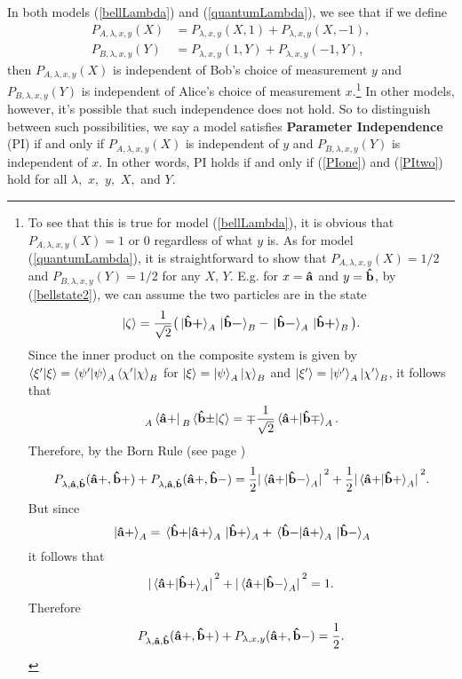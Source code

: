 In both models (\ref{bellLambda}) and (\ref{quantumLambda}), we see that if we define
\begin{align}
P_{A, \lambda,x,y}(X)&=P_{\lambda,x,y}(X, 1)+P_{\lambda,x,y}(X, -1),\label{PIone}\\
P_{B, \lambda,x,y}(Y)&=P_{\lambda,x,y}(1, Y)+P_{\lambda,x,y}(-1, Y),\label{PItwo}
\end{align}
then $P_{A,\lambda,x,y}(X)$ is independent of Bob's choice of measurement $y$ and $P_{B,\lambda,x,y}(Y)$ is independent of Alice's choice of measurement $x$.\footnote{To see that this is true for model (\ref{bellLambda}), it is obvious that $P_{A, \lambda,x,y}(X)=1$ or 0 regardless of what $y$ is. As for model (\ref{quantumLambda}), it is straightforward to show\label{onehalf} that $P_{A, \lambda,x,y}(X)=1/2$ and $P_{B,\lambda,x,y}(Y)=1/2$ for any $X,\, Y$. E.g. for $x=\vb{\hat{a}}$ and $y=\vb{\hat{b}}$, by (\ref{bellstate2}), we can assume the two particles are in the state 
$$\ket{\zeta}=\frac{1}{\sqrt{2}}\big(\ket*{\vb{\hat{{b}}}\bm{+}}_A\ket*{\vb{\hat{{b}}}\bm{-}}_B-\ket*{\vb{\hat{{b}}}\bm{-}}_A\ket*{\vb{\hat{{b}}}\bm{+}}_B\big).$$
Since the inner product on the composite system is given by  $\ip{\xi'}{\xi}=\ip{\psi'}{\psi}_A\ip{\chi'}{\chi}_B$ for $\ket{\xi}=\ket{\psi}_A\ket{\chi}_B$ and $\ket{\xi'}=\ket{\psi'}_A\ket{\chi'}_B$, it follows that 
$$\prescript{}{A}{ \bra*{\vb{\hat{a}+}}}\prescript{}{B}{\ip*{\vb{\hat{b}\pm}}{\zeta}}=\mp\frac{1}{\sqrt{2}}\ip*{\vb{\hat{a}+}}{\vb{\hat{b}\mp}}_A.$$ 
Therefore, by the Born Rule (see page \pageref{bornrule})
$$P_{\lambda,\vb{\hat{a}},\vb{\hat{b}}}(\vb{\hat{a}+}, \vb{\hat{b}+})+P_{\lambda,\vb{\hat{a}},\vb{\hat{b}}}(\vb{\hat{a}+}, \vb{\hat{b}-})=\frac{1}{2}\abs*{\ip*{\vb{\hat{a}+}}{\vb{\hat{b}-}}_A}^2+\frac{1}{2}\abs*{\ip*{\vb{\hat{a}+}}{\vb{\hat{b}+}}_A}^2.$$
But since
$$\ket*{\vb{\hat{a}+}}_A=\ip*{\vb{\hat{b}+}}{\vb{\hat{a}+}}_A\ket*{\vb{\hat{b}+}}_A+\ip*{\vb{\hat{b}-}}{\vb{\hat{a}+}}_A\ket*{\vb{\hat{b}-}}_A$$
it follows that 
$$\abs*{\ip*{\vb{\hat{a}+}}{\vb{\hat{b}+}}_A}^2+\abs*{\ip*{\vb{\hat{a}+}}{\vb{\hat{b}-}}_A}^2 =1. $$
Therefore 
$$P_{\lambda,\vb{\hat{a}},\vb{\hat{b}}}(\vb{\hat{a}+}, \vb{\hat{b}+})+P_{\lambda,x,y}(\vb{\hat{a}+}, \vb{\hat{b}-})=\frac{1}{2}.$$
 } In other models, however, it's possible that such independence does not hold. So to distinguish between such possibilities, we say a model satisfies \textbf{Parameter Independence} (PI) if and only if $P_{A,\lambda,x,y}(X)$ is independent of $y$ and $P_{B,\lambda,x,y}(Y)$ is independent of $x$. In other words, PI holds if and only if (\ref{PIone}) and (\ref{PItwo}) hold for all $\lambda,$ $x,$ $y,$ $X,$ and $Y$.

